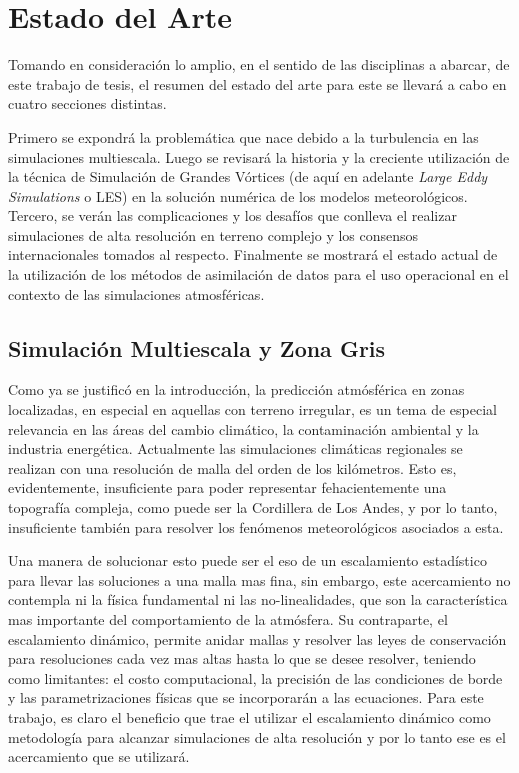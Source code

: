 \chapter{Estado del Arte}
Tomando en consideración lo amplio, en el sentido de las disciplinas a abarcar, de este trabajo de tesis, el resumen del estado del arte para este se llevará a cabo en cuatro secciones distintas. 

Primero se expondrá la problemática que nace debido a la turbulencia en las simulaciones multiescala. Luego se revisará la historia y la creciente utilización de la técnica de Simulación de Grandes Vórtices (de aquí en adelante \emph{Large Eddy Simulations} o LES) en la solución numérica de los modelos meteorológicos. Tercero, se verán las complicaciones y los desafíos que conlleva el realizar simulaciones de alta resolución en terreno complejo y los consensos internacionales tomados al respecto. Finalmente se mostrará el estado actual de la utilización de los métodos de asimilación de datos para el uso operacional en el contexto de las simulaciones atmosféricas.
\section{Simulación Multiescala y Zona Gris}
Como ya se justificó en la introducción, la predicción atmósférica en zonas localizadas, en especial en aquellas con terreno irregular, es un tema de especial relevancia en las áreas del cambio climático, la contaminación ambiental y la industria energética. Actualmente las simulaciones climáticas regionales se realizan con una resolución de malla del orden de los kilómetros. Esto es, evidentemente, insuficiente para poder representar fehacientemente una topografía compleja, como puede ser la Cordillera de Los Andes, y por lo tanto, insuficiente también para resolver los fenómenos meteorológicos asociados a esta.

Una manera de solucionar esto puede ser el eso de un escalamiento estadístico para llevar las soluciones a una malla mas fina, sin embargo, este acercamiento no contempla ni la física fundamental ni las no-linealidades, que son la característica mas importante del comportamiento de la atmósfera. Su contraparte, el escalamiento dinámico, permite anidar mallas y resolver las leyes de conservación para resoluciones cada vez mas altas hasta lo que se desee resolver, teniendo como limitantes: el costo computacional, la precisión de las condiciones de borde y las parametrizaciones físicas que se incorporarán a las ecuaciones. Para este trabajo, es claro el beneficio que trae el utilizar el escalamiento dinámico como metodología para alcanzar simulaciones de alta resolución y por lo tanto ese es el acercamiento que se utilizará.

